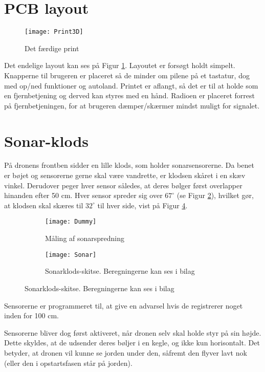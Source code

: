 \documentclass[Main]{subfiles}
\begin{document}
\section{PCB layout}

\begin{figure}[H]
\centering
\texttt{[image: Print3D]}
\caption{Det færdige print}
\label{fig: Print3D}
\end{figure}
Det endelige layout kan ses på Figur \ref{fig: Print3D}.
Layoutet er forsøgt holdt simpelt. 
Knapperne til brugeren er placeret så de minder om pilene på et tastatur, dog med op/ned funktioner og autoland.
Printet er aflangt, så det er til at holde som en fjernbetjening og derved kan styres med en hånd.
Radioen er placeret forrest på fjernbetjeningen, for at brugeren dæmper/skærmer mindst muligt for signalet.  


\newpage
\section{Sonar-klods}\label{Sec:Sonar}
På dronens frontben sidder en lille klods, som holder sonarsensorerne.
Da benet er bøjet og sensorerne gerne skal være vandrette, er klodsen skåret i en skæv vinkel.
Derudover peger hver sensor således, at deres bølger først overlapper hinanden efter 50 cm. 
Hver sensor spreder sig over $67^\circ$ (se Figur \ref{Fig:SonarMeasure}), hvilket gør, at klodsen skal skæres til $32^\circ$ til hver side, vist på Figur \ref{Fig:SonarSkitse}.
\begin{figure}[H]
\centering
	\begin{subfigure}[b]{0.45\textwidth}
		\texttt{[image: Dummy]}
		\caption{Måling af sonarspredning}
		\label{Fig:SonarMeasure}
	\end{subfigure}
	\quad
	\begin{subfigure}[b]{0.45\textwidth}
	\centering
		\texttt{[image: Sonar]}
		\caption{Sonarklods-skitse. Beregningerne kan ses i bilag\cite{Klods}}
		\label{Fig:SonarSkitse}
	\end{subfigure}
\end{figure}

Sensorerne er programmeret til, at give en advarsel hvis de registrerer noget inden for 100 cm.

Sensorerne bliver dog først aktiveret, når dronen selv skal holde styr på sin højde. Dette skyldes, at de udsender deres bøljer i en kegle, og ikke kun horisontalt. 
Det betyder, at dronen vil kunne se jorden under den, såfremt den flyver lavt nok (eller den i opstartsfasen står på jorden).
\end{document}
